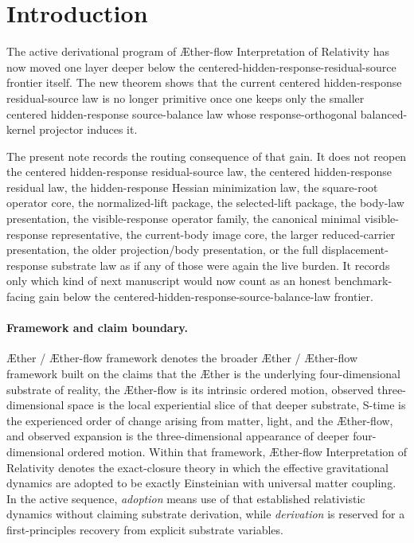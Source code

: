 \documentclass[11pt]{article}
\newcommand{\Aether}{\AE{}ther}
\newcommand{\Aflow}{\AE{}ther-flow}
\newcommand{\TheoryName}{\Aflow{} Interpretation of Relativity}
\newcommand{\TheoryProgram}{\Aether{} / \Aflow{} framework}
\begin{document}
\section{Introduction}

The active derivational program of \TheoryName{} has now moved one layer deeper below the centered-hidden-response-residual-source frontier itself. The new theorem shows that the current centered hidden-response residual-source law is no longer primitive once one keeps only the smaller centered hidden-response source-balance law whose response-orthogonal balanced-kernel projector induces it.

The present note records the routing consequence of that gain. It does not reopen the centered hidden-response residual-source law, the centered hidden-response residual law, the hidden-response Hessian minimization law, the square-root operator core, the normalized-lift package, the selected-lift package, the body-law presentation, the visible-response operator family, the canonical minimal visible-response representative, the current-body image core, the larger reduced-carrier presentation, the older projection/body presentation, or the full displacement-response substrate law as if any of those were again the live burden. It records only which kind of next manuscript would now count as an honest benchmark-facing gain below the centered-hidden-response-source-balance-law frontier.

\paragraph{Framework and claim boundary.}
\TheoryProgram{} denotes the broader \Aether{} / \Aflow{} framework built on the claims that the \Aether{} is the underlying four-dimensional substrate of reality, the \Aflow{} is its intrinsic ordered motion, observed three-dimensional space is the local experiential slice of that deeper substrate, S-time is the experienced order of change arising from matter, light, and the \Aflow{}, and observed expansion is the three-dimensional appearance of deeper four-dimensional ordered motion. Within that framework, \TheoryName{} denotes the exact-closure theory in which the effective gravitational dynamics are adopted to be exactly Einsteinian with universal matter coupling. In the active sequence, \emph{adoption} means use of that established relativistic dynamics without claiming substrate derivation, while \emph{derivation} is reserved for a first-principles recovery from explicit substrate variables.
\end{document}
